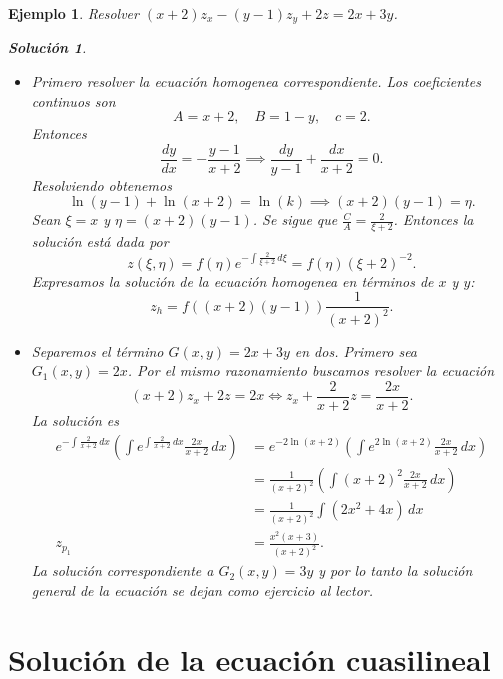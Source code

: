 \documentclass[11pt,letterpaper,draft]{report}
\newtheorem{example}[defn]{Ejemplo}
\newtheorem*{sol}{Solución}
\newcommand\<{\langle}
\renewcommand\>{\rangle}
\begin{document}
\begin{example}
  Resolver $(x+2)z_x - (y-1)z_y + 2z = 2x + 3y$.
  \begin{sol}
    \begin{itemize}
      \item Primero resolver la ecuación homogenea
        correspondiente. Los coeficientes continuos son
        \[
        A = x + 2, \quad B = 1 - y, \quad c = 2.
        \] 
        Entonces
        \[
        \frac{dy}{dx} = -\frac{y-1}{x+2} \implies
        \frac{dy}{y-1} + \frac{dx}{x+2} = 0.
        \] 
        Resolviendo obtenemos
        \[
        \ln(y-1) + \ln(x+2) = \ln(k) \implies (x+2)(y-1) =
        \eta.
        \] 
        Sean $\xi = x$ y $\eta = (x+2)(y-1)$. Se sigue que
        $\frac{C}{A} = \frac{2}{\xi + 2}$. Entonces la
        solución está dada por
        \[
        z(\xi,\eta) = f(\eta)e^{-\int \frac{2}{\xi+2} \,
        d\xi} = f(\eta)(\xi+2)^{-2}.
        \] 
        Expresamos la solución de la ecuación homogenea en
        términos de $x$ y $y$:
        \[
        z_h = f((x+2)(y-1)) \frac{1}{(x+2)^2}.
        \] 
      \item Separemos el término $G(x,y) = 2x + 3y$ en dos.
        Primero sea $G_1(x,y) = 2x$. Por el mismo
        razonamiento buscamos resolver la ecuación 
        \[
          (x+2)z_x + 2z = 2x \iff z_x + \frac{2}{x+2}z =
          \frac{2x}{x+2}.
        \] 
        La solución es
        \begin{align*}
          e^{-\int \frac{2}{x+2} \, dx} \left(\int e^{\int
            \frac{2}{x+2} \, dx} \frac{2x}{x+2} \, dx\right)
            &=
            e^{-2\ln(x+2)}\left(\int e^{2\ln(x+2)}
            \frac{2x}{x+2} \, dx\right)\\
            &=
            \frac{1}{(x+2)^2}\left(\int (x+2)^2
            \frac{2x}{x+2} \, dx\right)\\
            &= \frac{1}{(x+2)^2} \int
            \left(2x^2 + 4x\right) \, dx\\
            z_{p_1} &= \frac{x^2(x+3)}{(x+2)^2}.
        \end{align*}
        La solución correspondiente a $G_2(x,y) = 3y$ y por
        lo tanto la solución general de la ecuación se dejan
        como ejercicio al lector.
    \end{itemize}
  \end{sol}
\end{example}

\section{Solución de la ecuación cuasilineal}
\end{document}
